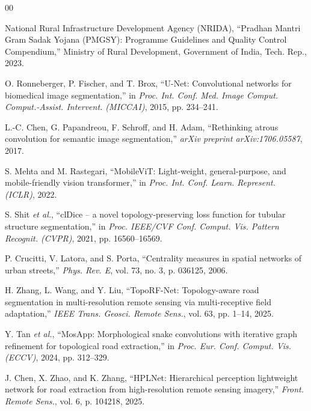 \documentclass[conference]{IEEEtran}
\begin{document}
\begin{thebibliography}{00}

 National Rural Infrastructure Development Agency (NRIDA), ``Pradhan Mantri Gram Sadak Yojana (PMGSY): Programme Guidelines and Quality Control Compendium,'' Ministry of Rural Development, Government of India, Tech. Rep., 2023.

 O. Ronneberger, P. Fischer, and T. Brox, ``U-Net: Convolutional networks for biomedical image segmentation,'' in \textit{Proc. Int. Conf. Med. Image Comput. Comput.-Assist. Intervent. (MICCAI)}, 2015, pp. 234--241.

 L.-C. Chen, G. Papandreou, F. Schroff, and H. Adam, ``Rethinking atrous convolution for semantic image segmentation,'' \textit{arXiv preprint arXiv:1706.05587}, 2017.

 S. Mehta and M. Rastegari, ``MobileViT: Light-weight, general-purpose, and mobile-friendly vision transformer,'' in \textit{Proc. Int. Conf. Learn. Represent. (ICLR)}, 2022.

 S. Shit \textit{et al.}, ``clDice -- a novel topology-preserving loss function for tubular structure segmentation,'' in \textit{Proc. IEEE/CVF Conf. Comput. Vis. Pattern Recognit. (CVPR)}, 2021, pp. 16560--16569.

 P. Crucitti, V. Latora, and S. Porta, ``Centrality measures in spatial networks of urban streets,'' \textit{Phys. Rev. E}, vol. 73, no. 3, p. 036125, 2006.

 H. Zhang, L. Wang, and Y. Liu, ``TopoRF-Net: Topology-aware road segmentation in multi-resolution remote sensing via multi-receptive field adaptation,'' \textit{IEEE Trans. Geosci. Remote Sens.}, vol. 63, pp. 1--14, 2025.

 Y. Tan \textit{et al.}, ``MosApp: Morphological snake convolutions with iterative graph refinement for topological road extraction,'' in \textit{Proc. Eur. Conf. Comput. Vis. (ECCV)}, 2024, pp. 312--329.

 J. Chen, X. Zhao, and K. Zhang, ``HPLNet: Hierarchical perception lightweight network for road extraction from high-resolution remote sensing imagery,'' \textit{Front. Remote Sens.}, vol. 6, p. 104218, 2025.


\end{thebibliography}
\end{document}
